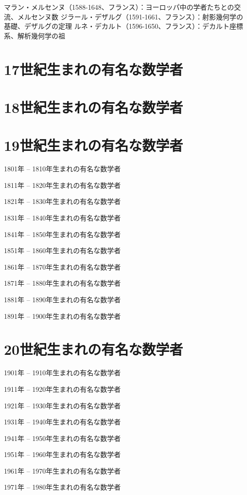 \documentclass[a4paper,12pt]{jsarticle}
\theoremstyle{plain}
\theoremstyle{remark}  %
\theoremstyle{definition}  %
\begin{document}
    マラン・メルセンヌ（1588-1648、フランス）：ヨーロッパ中の学者たちとの交流、メルセンヌ数
    ジラール・デザルグ（1591-1661、フランス）：射影幾何学の基礎、デザルグの定理
    ルネ・デカルト（1596-1650、フランス）：デカルト座標系、解析幾何学の祖

\section{17世紀生まれの有名な数学者}

\section{18世紀生まれの有名な数学者}

\section{19世紀生まれの有名な数学者}
1801年 -- 1810年生まれの有名な数学者

1811年 -- 1820年生まれの有名な数学者

1821年 -- 1830年生まれの有名な数学者

1831年 -- 1840年生まれの有名な数学者

1841年 -- 1850年生まれの有名な数学者

1851年 -- 1860年生まれの有名な数学者

1861年 -- 1870年生まれの有名な数学者

1871年 -- 1880年生まれの有名な数学者

1881年 -- 1890年生まれの有名な数学者

1891年 -- 1900年生まれの有名な数学者

\section{20世紀生まれの有名な数学者}
1901年 -- 1910年生まれの有名な数学者

1911年 -- 1920年生まれの有名な数学者

1921年 -- 1930年生まれの有名な数学者

1931年 -- 1940年生まれの有名な数学者

1941年 -- 1950年生まれの有名な数学者

1951年 -- 1960年生まれの有名な数学者

1961年 -- 1970年生まれの有名な数学者

1971年 -- 1980年生まれの有名な数学者




\end{document}
